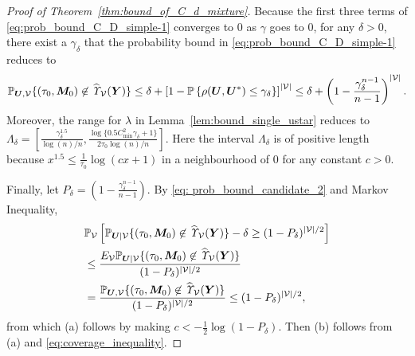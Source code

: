 \documentclass[12pt]{article}
\theoremstyle{shortspace}
\def\*#1{\bm{#1}}
\def\P{\mathbb P}
\begin{document}
 
 \begin{proof}[Proof of Theorem~\ref{thm:bound_of_C_d_mixture}]
Because the first three terms of \eqref{eq:prob_bound_C_D_simple-1} converges to 0 as $\gamma$ goes to 0, for any $\delta >0$, there exist a $\gamma_{\delta}$ that the probability bound in  \eqref{eq:prob_bound_C_D_simple-1} reduces to 
\begin{align}
\label{eq: prob_bound_candidate_2}
    \P_{\*U, {\mathcal V}}\{(\tau_0,\*M_0)\not\in \widehat{\it \Upsilon}_{{\mathcal V}}(\*Y)\} \leq \delta + \left[1- \P\left\{\mathcal \rho(\*U, \*U^*) \leq \gamma_{\delta}\right\}\right]^{|{\mathcal V}|}  \leq\delta + \left(1-\frac{\gamma_\delta^{n-1}}{n-1}\right)^{|{\mathcal V}|}.
\end{align} 
Moreover, the range for $\lambda$ in Lemma~\ref{lem:bound_single_ustar} reduces to $\Lambda_{\delta} =[\frac{\gamma_{\delta}^{1.5}}{\log(n)/n},\frac{\log\{0.5C^2_{\min}\gamma_{\delta} + 1\}}{2 \tau_0 \log(n)/n}].$  
Here the interval $\Lambda_{\delta}$ is of positive length because $x^{1.5} \leq \frac{1}{\tau_0}\log(cx+1)$ in a neighbourhood of 0 for any constant $c>0.$ 

 
 Finally, let $  P_\delta = \left(1-\frac{\gamma_\delta^{n-1}}{n-1}\right)$. By \eqref{eq: prob_bound_candidate_2} and Markov Inequality,
 \begin{align*}
      &   \P_{{\mathcal V}}\left[\P_{\*U| {\mathcal V}}\{(\tau_0,\*M_0)\not\in \widehat{\it \Upsilon}_{{\mathcal V}}(\*Y)\} -\delta \geq (1-    P_{\delta})^{|{\mathcal V}|/2}\right]\\
      & \leq  \frac{E_{{\mathcal V}}\P_{\*U|{\mathcal V}}\{(\tau_0,\*M_0)\not\in \widehat{\it \Upsilon}_{{\mathcal V}}(\*Y)\}}{(1-  P_{\delta })^{|{\mathcal V}|/2}} \\
      & =  \frac{\P_{\*U,{\mathcal V}}\{(\tau_0,\*M_0)\not\in \widehat{\it \Upsilon}_{{\mathcal V}}(\*Y)\}}{(1-  P_{\delta })^{|{\mathcal V}|/2}} 
      \leq {(1-  P_{\delta })^{|{\mathcal V}|/2}},
 \end{align*}
from which (a) follows by making $c<-\frac{1}{2}\log(1-   P_\delta).$ Then (b) follows from (a) and \eqref{eq:coverage_inequality}. 
\end{proof}
\end{document}
